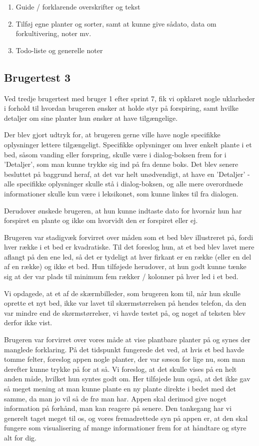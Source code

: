 \begin{enumerate}
    \item Guide / forklarende overskrifter og tekst
    \item Tilføj egne planter og sorter, samt at kunne give sådato, data om forkultivering, noter mv.
    \item Todo-liste og generelle noter
\end{enumerate}

\subsection{Brugertest 3}

Ved tredje brugertest med bruger 1 efter sprint 7, fik vi opklaret nogle uklarheder i forhold til hvordan brugeren ønsker at holde styr på forspiring, samt hvilke detaljer om sine planter hun ønsker at have tilgængelige.

Der blev gjort udtryk for, at brugeren gerne ville have nogle specifikke oplysninger lettere tilgængeligt. Specifikke oplysninger om hver enkelt plante i et bed, såsom vanding eller forspring, skulle være i dialog-boksen frem for i 'Detaljer', som man kunne trykke sig ind på fra denne boks. Det blev senere besluttet på baggrund heraf, at det var helt unødvendigt, at have en 'Detaljer' - alle specifikke oplysninger skulle stå i dialog-boksen, og alle mere overordnede informationer skulle kun være i leksikonet, som kunne linkes til fra dialogen. 

Derudover ønskede brugeren, at hun kunne indtaste dato for hvornår hun har forspiret en plante og ikke om hvorvidt den er forspiret eller ej.

Brugeren var stadigvæk forvirret over måden som et bed blev illustreret på, fordi hver række i et bed er kvadratiske. Til det foreslog hun, at et bed blev lavet mere aflangt på den ene led, så det er tydeligt at hver firkant er en række (eller en del af en række) og ikke et bed. Hun tilføjede herudover, at hun godt kunne tænke sig at der var plads til minimum fem rækker / kolonner på hver led i et bed.

Vi opdagede, at et af de skærmbilleder, som brugeren kom til, når hun skulle oprette et nyt bed, ikke var lavet til skærmstørrelsen på hendes telefon, da den var mindre end de skørmstørrelser, vi havde testet på, og noget af teksten blev derfor ikke vist.

Brugeren var forvirret over vores måde at vise plantbare planter på og synes der manglede forklaring. På det tidspunkt fungerede det ved, at hvis et bed havde tomme felter, foreslog appen nogle planter, der var sæson for lige nu, som man derefter kunne trykke på for at så. Vi foreslog, at det skulle vises på en helt anden måde, hvilket hun syntes godt om. Her tilføjede hun også, at det ikke gav så meget mening at man kunne plante en ny plante direkte i bedet med det samme, da man jo vil så de frø man har. Appen skal derimod give noget information på forhånd, man kan reagere på senere. Den tankegang har vi generelt taget meget til os, og vores fremadrettede syn på appen er, at den skal fungere som visualisering af mange informationer frem for at håndtare og styre alt for dig.

